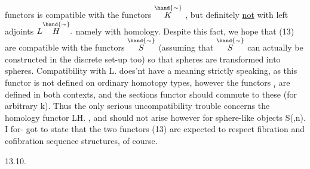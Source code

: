 functors is compatible with the functors $\overset{\hand{\sim}}{K}$ , but  definitely \uline{not} with  
left adjoints $L\overset{\hand{\sim}}{H}.$ namely with homology. Despite this fact, we hope  that
 (13) are compatible with the functors $\overset{\hand{\sim}}{S}$ (assuming that $\overset{\hand{\sim}}{S}$ can actually
be constructed in the discrete set-up too)\hand{,}  so that spheres are
transformed into spheres. Compatibility with L\hand{$\Pi$}. does'nt have a meaning
strictly speaking, as this functor is not defined on ordinary homotopy
types, however the functors \hand{$\Pi$}$_i$ are defined in both contexts, and the
sections functor should commute to these (for arbitrary k). Thus the
only serious uncompatibility trouble concerns the homology functor LH. ,
 and should not arise however for sphere-like objects S(,n). \xout{-} I for-%
got to state  that the two functors (13) are expected to  respect
fibration and cofibration sequence structures, of course.

13.10.


